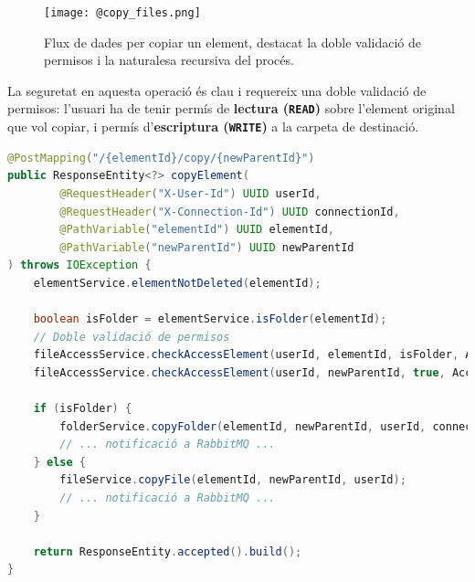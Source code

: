 \begin{figure}[H]
    \centering
    \texttt{[image: @copy\_files.png]}
    \caption{Flux de dades per copiar un element, destacat la doble validació de permisos i la naturalesa recursiva del procés.}
\end{figure}

La seguretat en aquesta operació és clau i requereix una doble validació de permisos: l'usuari ha de tenir permís de \textbf{lectura (\texttt{READ})} sobre l'element original que vol copiar, i permís d'\textbf{escriptura (\texttt{WRITE})} a la carpeta de destinació.

\begin{lstlisting}[language=Java, caption={Endpoint per a la còpia d'elements a `ElementController`}]
@PostMapping("/{elementId}/copy/{newParentId}")
public ResponseEntity<?> copyElement(
        @RequestHeader("X-User-Id") UUID userId,
        @RequestHeader("X-Connection-Id") UUID connectionId,
        @PathVariable("elementId") UUID elementId,
        @PathVariable("newParentId") UUID newParentId
) throws IOException {
    elementService.elementNotDeleted(elementId);
    
    boolean isFolder = elementService.isFolder(elementId);
    // Doble validació de permisos
    fileAccessService.checkAccessElement(userId, elementId, isFolder, AccessType.READ);
    fileAccessService.checkAccessElement(userId, newParentId, true, AccessType.WRITE);

    if (isFolder) {
        folderService.copyFolder(elementId, newParentId, userId, connectionId.toString());
        // ... notificació a RabbitMQ ...
    } else {
        fileService.copyFile(elementId, newParentId, userId);
        // ... notificació a RabbitMQ ...
    }

    return ResponseEntity.accepted().build();
}
\end{lstlisting}

